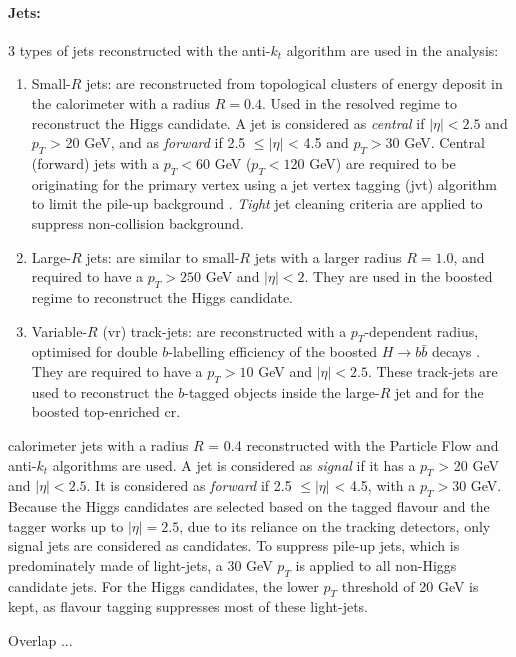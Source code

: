 \paragraph{Jets:} 3 types of jets reconstructed with the anti-$k_t$ algorithm \cite{Cacciari:2008gp} are used in the analysis:
\begin{enumerate}
  \item Small-$R$ jets: are reconstructed from topological clusters of energy deposit in the calorimeter with a radius $R = 0.4$. Used in the resolved regime to reconstruct the Higgs candidate. A jet is considered as \textit{central} if $|\eta| < 2.5$ and $p_T$ > 20 GeV, and as \textit{forward} if 2.5 $\leq |\eta|$ < 4.5 and $p_T > 30$ GeV. Central (forward) jets with a $p_T < 60$ GeV ($p_T < 120$ GeV) are required to be originating for the primary vertex using a jet vertex tagging (\gls{jvt}) algorithm to limit the pile-up background \cite{atlasPUJVT}. \textit{Tight} jet cleaning criteria are applied to suppress non-collision background.
  \item Large-$R$ jets: are similar to small-$R$ jets with a larger radius $R = 1.0$, and required to have a $p_T > 250$ GeV and $|\eta| < 2$. They are used in the boosted regime to reconstruct the Higgs candidate. 
  \item Variable-$R$ (\gls{vr}) track-jets: are reconstructed with a $p_T$-dependent radius, optimised for double $b$-labelling efficiency of the boosted $H \rightarrow b\bar{b}$ decays \cite{ATL-PHYS-PUB-2017-010}. They are required to have a $p_T > 10$ GeV and $|\eta| < 2.5$. These track-jets are used to reconstruct the $b$-tagged objects inside the large-$R$ jet and for the boosted top-enriched \gls{cr}. 
\end{enumerate}

calorimeter jets with a radius $R$ = 0.4 reconstructed with the Particle Flow and anti-$k_t$ algorithms \cite{Cacciari:2008gp} are used. A jet is considered as \textit{signal} if it has a $p_T$ > 20 GeV and $|\eta| < 2.5$. It is considered as \textit{forward} if 2.5 $\leq |\eta|$ < 4.5, with a $p_T > 30$ GeV. Because the Higgs candidates are selected based on the tagged flavour and the tagger works up to $|\eta| = 2.5$, due to its reliance on the tracking detectors, only signal jets are considered as candidates. To suppress pile-up jets, which is predominately made of light-jets, a 30 GeV $p_T$ is applied to all non-Higgs candidate jets. For the Higgs candidates, the lower $p_T$ threshold of 20 GeV is kept, as flavour tagging suppresses most of these light-jets. 

Overlap ...